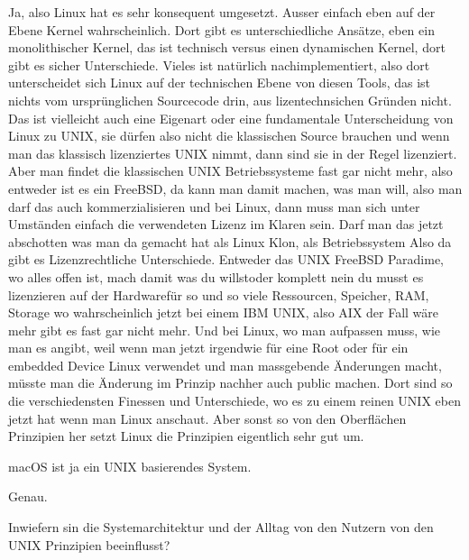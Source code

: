 \begin{description}
\NH Ja, also Linux hat es sehr konsequent umgesetzt. Ausser einfach eben auf der Ebene Kernel wahrscheinlich. Dort gibt es unterschiedliche Ansätze, eben ein monolithischer Kernel, das ist technisch versus einen dynamischen Kernel, dort gibt es sicher Unterschiede. Vieles ist natürlich nachimplementiert, also dort unterscheidet sich Linux auf der technischen Ebene von diesen Tools, das ist nichts vom ursprünglichen Sourcecode drin, aus lizentechnsichen Gründen nicht. Das ist vielleicht auch eine Eigenart oder eine fundamentale Unterscheidung von Linux zu UNIX, sie dürfen also nicht die klassischen Source brauchen und wenn man das klassisch lizenziertes UNIX nimmt, dann sind sie in der Regel lizenziert. Aber man findet die klassischen UNIX Betriebssysteme fast gar nicht mehr, also entweder ist es ein FreeBSD, da kann man damit machen, was man will, also man darf das auch kommerzialisieren und bei Linux, dann muss man sich unter Umständen einfach die verwendeten Lizenz im Klaren sein. Darf man das jetzt abschotten was man da gemacht hat als Linux Klon, als Betriebssystem Also da gibt es Lizenzrechtliche Unterschiede. Entweder das UNIX FreeBSD Paradime, wo alles offen ist, \glqq mach damit was du willst\grqq oder komplett \glqq nein du musst es lizenzieren auf der Hardware\grqq für so und so viele Ressourcen, Speicher, RAM, Storage wo wahrscheinlich jetzt bei einem IBM UNIX, also AIX der Fall wäre mehr gibt es fast gar nicht mehr. Und bei Linux, wo man aufpassen muss, wie man es angibt, weil wenn man jetzt irgendwie für eine Root oder für ein embedded Device Linux verwendet und man massgebende Änderungen macht, müsste man die Änderung im Prinzip nachher auch public machen. Dort sind so die verschiedensten Finessen und Unterschiede, wo es zu einem reinen UNIX eben jetzt hat wenn man Linux anschaut. Aber sonst so von den Oberflächen Prinzipien her setzt Linux die Prinzipien eigentlich sehr gut um.
	
\DS macOS ist ja ein UNIX basierendes System.

\NH Genau.

\DS Inwiefern sin die Systemarchitektur und der Alltag von den Nutzern von den UNIX Prinzipien beeinflusst?


\end{description}
